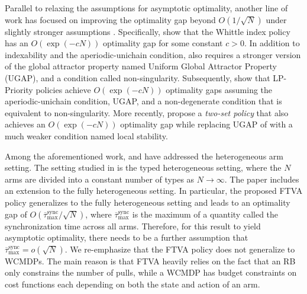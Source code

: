 \documentclass{article}
\theoremstyle{plain}
\theoremstyle{remark}
\begin{document}
Parallel to relaxing the assumptions for asymptotic optimality, another line of work has focused on improving the optimality gap beyond $O(1/\sqrt{N})$ under slightly stronger assumptions \citep{GasGauYan_23_exponential,GasGauYan_23_whittles,hong2024exponential}.
Specifically, \citet{GasGauYan_23_whittles} show that the Whittle index policy has an $O(\exp(-cN))$ optimality gap for some constant $c>0$. In addition to indexability and the aperiodic-unichain condition, \citep{GasGauYan_23_whittles} also requires a stronger version of the global attractor property named Uniform Global Attractor Property (UGAP), and a condition called non-singularity.
Subsequently, \citet{GasGauYan_23_exponential} show that LP-Priority policies achieve $O(\exp(-cN))$ optimality gaps assuming the aperiodic-unichain condition, UGAP, and a non-degenerate condition that is equivalent to non-singularity.
More recently, \citet{hong2024exponential} propose a \emph{two-set policy} that also achieves an $O(\exp(-cN))$ optimality gap while replacing UGAP of \citep{GasGauYan_23_exponential} with a much weaker condition named local stability.

Among the aforementioned work, \cite{Ver_16_verloop} and \cite{HonXieChe_23} have addressed the heterogeneous arm setting.
The setting studied in \citep{Ver_16_verloop} is the typed heterogeneous setting, where the $N$ arms are divided into a constant number of types as $N\to\infty$.  
The paper \citep{HonXieChe_23} includes an extension to the fully heterogeneous setting.
In particular, the proposed FTVA policy generalizes to the fully heterogeneous setting and leads to an optimality gap of $O(\overline{\tau}^{\text{sync}}_{\max}/\sqrt{N})$, where $\overline{\tau}^{\text{sync}}_{\max}$ is the maximum of a quantity called the synchronization time across all arms.
Therefore, for this result to yield asymptotic optimality, there needs to be a further assumption that $\overline{\tau}^{\text{sync}}_{\max}=o(\sqrt{N})$.
We re-emphasize that the FTVA policy does not generalize to WCMDPs.
The main reason is that FTVA heavily relies on the fact that an RB only constrains the number of pulls, while a WCMDP has budget constraints on cost functions each depending on both the state and action of an arm. 
\end{document}
